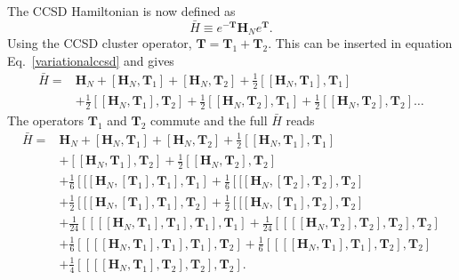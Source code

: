 \documentclass[a4paper,norsk,11pt,twoside]{report}
\begin{document}
The CCSD Hamiltonian is now defined as
\begin{equation}
\bar{H} \equiv e^{-\textbf{T}} \textbf{H}_N e^{\textbf{T}}  .
\end{equation}
Using the CCSD cluster operator, $\textbf{T} = \textbf{T}_1 +
\textbf{T}_2$. This can be inserted in equation
Eq.~\eqref{variationalccsd} and gives
\begin{align}
\bar{H} = & 
\textbf{H}_N 
+ \left[ \textbf{H}_N, \textbf{T}_1 \right] 
+ \left[ \textbf{H}_N, \textbf{T}_2 \right] 
+ \frac{1}{2} \left[ [\textbf{H}_N, \textbf{T}_1], \textbf{T}_1 \right]  \\ &
+ \frac{1}{2} \left[ [\textbf{H}_N, \textbf{T}_1], \textbf{T}_2  \right]
+ \frac{1}{2} \left[ [\textbf{H}_N, \textbf{T}_2], \textbf{T}_1 \right]
+ \frac{1}{2} \left[ [\textbf{H}_N, \textbf{T}_2], \textbf{T}_2 \right] \dots \nonumber
\end{align}
The operators $\textbf{T}_1$ and $\textbf{T}_2$ commute and  the full $\bar{H}$ reads
\begin{align}
\bar{H} = & 
\textbf{H}_N 
+ \left[ \textbf{H}_N, \textbf{T}_1 \right] 
+ \left[ \textbf{H}_N, \textbf{T}_2 \right] 
+ \frac{1}{2} \left[ [\textbf{H}_N, \textbf{T}_1], \textbf{T}_1 \right] \label{temp_hamil_ccsd} \\ &
+ \left[ [\textbf{H}_N, \textbf{T}_1], \textbf{T}_2  \right]
+ \frac{1}{2} \left[ [\textbf{H}_N, \textbf{T}_2], \textbf{T}_2 \right] \nonumber \\ &
+ \frac{1}{6} \left[ [ [ \textbf{H}_N,[\textbf{T}_1], \textbf{T}_1], \textbf{T}_1 \right]
+ \frac{1}{6} \left[ [ [ \textbf{H}_N,[\textbf{T}_2], \textbf{T}_2], \textbf{T}_2 \right] \nonumber \\ &
+ \frac{1}{2} \left[ [ [ \textbf{H}_N,[\textbf{T}_1], \textbf{T}_1], \textbf{T}_2 \right]
+ \frac{1}{2} \left[ [ [ \textbf{H}_N,[\textbf{T}_1], \textbf{T}_2], \textbf{T}_2 \right] \nonumber \\ &
+ \frac{1}{24} \left[ [ [ [\textbf{H}_N, \textbf{T}_1], \textbf{T}_1], \textbf{T}_1], \textbf{T}_1  \right]
+ \frac{1}{24} \left[ [ [ [\textbf{H}_N, \textbf{T}_2], \textbf{T}_2], \textbf{T}_2], \textbf{T}_2  \right] \nonumber \\ &
+ \frac{1}{6} \left[ [ [ [\textbf{H}_N, \textbf{T}_1], \textbf{T}_1], \textbf{T}_1], \textbf{T}_2  \right]
+ \frac{1}{6} \left[ [ [ [\textbf{H}_N, \textbf{T}_1], \textbf{T}_1], \textbf{T}_2], \textbf{T}_2  \right] \nonumber \\ &
+ \frac{1}{4} \left[ [ [ [\textbf{H}_N, \textbf{T}_1], \textbf{T}_2], \textbf{T}_2], \textbf{T}_2  \right] . \nonumber
\end{align}
\end{document}
